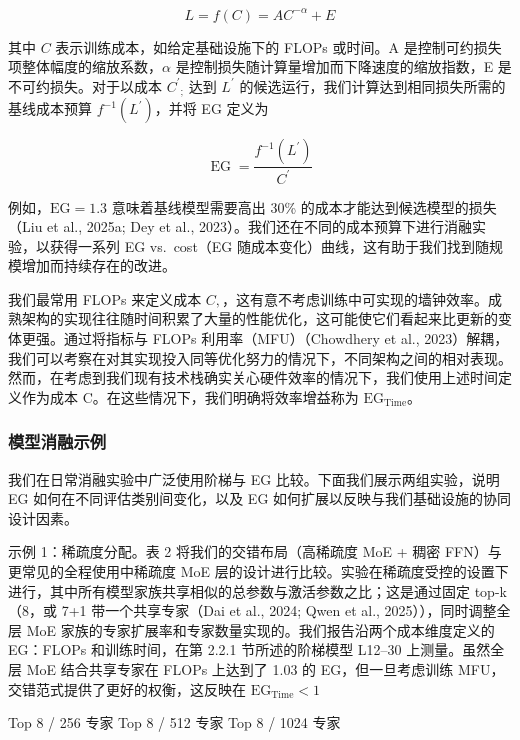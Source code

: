 \documentclass[
  10
]{article}
\begin{document}
\[
L = f ( C ) = A C ^ { - \alpha } + E\tag{1}
\]

其中 \(C\) 表示训练成本，如给定基础设施下的 FLOPs 或时间。A 是控制可约损失项整体幅度的缩放系数，$\alpha$ 是控制损失随计算量增加而下降速度的缩放指数，E 是不可约损失。对于以成本 \(C ^ { \prime } { _ { ; } }\) 达到 \(L ^ { \prime }\) 的候选运行，我们计算达到相同损失所需的基线成本预算
\(f ^ { - 1 } ( L ^ { \prime } )\)，并将 EG 定义为

\[
\operatorname { E G } = { \frac { f ^ { - 1 } ( L ^ { \prime } ) } { C ^ { \prime } } }\tag{2}
\]

例如，$\mathrm{EG} = 1.3$ 意味着基线模型需要高出 30\% 的成本才能达到候选模型的损失（Liu et al., 2025a; Dey et al., 2023）。我们还在不同的成本预算下进行消融实验，以获得一系列 EG vs.~cost（EG 随成本变化）曲线，这有助于我们找到随规模增加而持续存在的改进。

我们最常用 FLOPs 来定义成本 \(C ,\)，这有意不考虑训练中可实现的墙钟效率。成熟架构的实现往往随时间积累了大量的性能优化，这可能使它们看起来比更新的变体更强。通过将指标与 FLOPs 利用率（MFU）（Chowdhery et al., 2023）解耦，我们可以考察在对其实现投入同等优化努力的情况下，不同架构之间的相对表现。然而，在考虑到我们现有技术栈确实关心硬件效率的情况下，我们使用上述时间定义作为成本 C。在这些情况下，我们明确将效率增益称为 \(\mathrm { E G } _ { \mathrm { T i m e } }\)。

\subsubsection{模型消融示例}\label{model-ablation-examples}

我们在日常消融实验中广泛使用阶梯与 EG 比较。下面我们展示两组实验，说明 EG 如何在不同评估类别间变化，以及 EG 如何扩展以反映与我们基础设施的协同设计因素。

示例 1：稀疏度分配。表 2 将我们的交错布局（高稀疏度 MoE + 稠密 FFN）与更常见的全程使用中稀疏度 MoE 层的设计进行比较。实验在稀疏度受控的设置下进行，其中所有模型家族共享相似的总参数与激活参数之比；这是通过固定 top-k（8，或 7+1 带一个共享专家（Dai et al., 2024; Qwen et al., 2025）），同时调整全层 MoE 家族的专家扩展率和专家数量实现的。我们报告沿两个成本维度定义的 EG：FLOPs 和训练时间，在第 2.2.1 节所述的阶梯模型 L12--30 上测量。虽然全层 MoE 结合共享专家在 FLOPs 上达到了 1.03 的 EG，但一旦考虑训练 MFU，交错范式提供了更好的权衡，这反映在
\(\mathrm { E G } _ { \mathrm { T i m e } } < 1\)



Top 8 / 256 专家 Top 8 / 512 专家 Top 8 / 1024 专家
\end{document}
